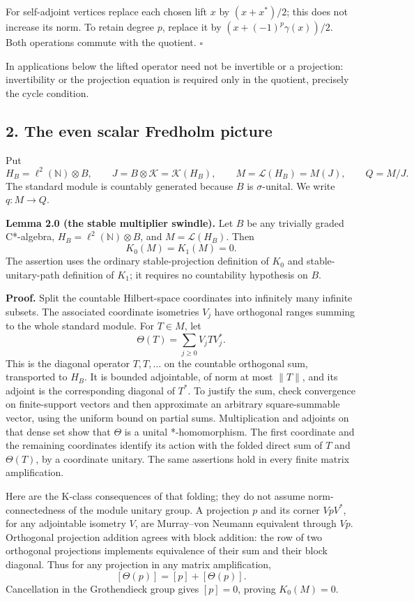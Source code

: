 \documentclass[
  11pt,
]{article}
\begin{document}
For self-adjoint vertices replace each chosen lift \(x\) by
\((x+x^*)/2\); this does not increase its norm. To retain degree \(p\),
replace it by \((x+(-1)^p\gamma(x))/2\). Both operations commute with
the quotient. \(\square\)

In applications below the lifted operator need not be invertible or a
projection: invertibility or the projection equation is required only in
the quotient, precisely the cycle condition.

\subsection{2. The even scalar Fredholm
picture}\label{the-even-scalar-fredholm-picture}

Put \[
H_B=\ell^2(\mathbb N)\otimes B,\qquad
J=B\otimes\mathcal K=\mathcal K(H_B),\qquad
M=\mathcal L(H_B)=M(J),\qquad Q=M/J.
\tag{2.1}
\] The standard module is countably generated because \(B\) is
\(\sigma\)-unital. We write \(q:M\to Q\).

\textbf{Lemma 2.0 (the stable multiplier swindle).} Let \(B\) be any
trivially graded C*-algebra, \(H_B=\ell^2(\mathbb N)\otimes B\), and
\(M=\mathcal L(H_B)\). Then \[
K_0(M)=K_1(M)=0.
\] The assertion uses the ordinary stable-projection definition of
\(K_0\) and stable-unitary-path definition of \(K_1\); it requires no
countability hypothesis on \(B\).

\textbf{Proof.} Split the countable Hilbert-space coordinates into
infinitely many infinite subsets. The associated coordinate isometries
\(V_j\) have orthogonal ranges summing to the whole standard module. For
\(T\in M\), let \[
\Theta(T)=\sum_{j\geq0}V_jTV_j^*.
\] This is the diagonal operator \(T,T,\ldots\) on the countable
orthogonal sum, transported to \(H_B\). It is bounded adjointable, of
norm at most \(\|T\|\), and its adjoint is the corresponding diagonal of
\(T^*\). To justify the sum, check convergence on finite-support vectors
and then approximate an arbitrary square-summable vector, using the
uniform bound on partial sums. Multiplication and adjoints on that dense
set show that \(\Theta\) is a unital *-homomorphism. The first
coordinate and the remaining coordinates identify its action with the
folded direct sum of \(T\) and \(\Theta(T)\), by a coordinate unitary.
The same assertions hold in every finite matrix amplification.

Here are the K-class consequences of that folding; they do not assume
norm-connectedness of the module unitary group. A projection \(p\) and
its corner \(VpV^*\), for any adjointable isometry \(V\), are
Murray--von Neumann equivalent through \(Vp\). Orthogonal projection
addition agrees with block addition: the row of two orthogonal
projections implements equivalence of their sum and their block
diagonal. Thus for any projection in any matrix amplification, \[
[\Theta(p)]=[p]+[\Theta(p)].
\] Cancellation in the Grothendieck group gives \([p]=0\), proving
\(K_0(M)=0\).
\end{document}

